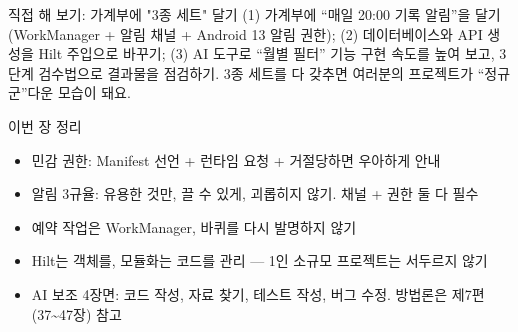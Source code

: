 \begin{tcbpractice}{직접 해 보기: 가계부에 "3종 세트" 달기}
(1) 가계부에 “매일 20:00 기록 알림”을 달기(WorkManager + 알림 채널 + Android 13 알림 권한); (2) 데이터베이스와 API 생성을 Hilt 주입으로 바꾸기; (3) AI 도구로 “월별 필터” 기능 구현 속도를 높여 보고, 3단계 검수법으로 결과물을 점검하기. 3종 세트를 다 갖추면 여러분의 프로젝트가 “정규군”다운 모습이 돼요.

\end{tcbpractice}

\begin{tcbsummary}{이번 장 정리}
\begin{itemize}
  \item 민감 권한: Manifest 선언 + 런타임 요청 + 거절당하면 우아하게 안내
  \item 알림 3규율: 유용한 것만, 끌 수 있게, 괴롭히지 않기. 채널 + 권한 둘 다 필수
  \item 예약 작업은 WorkManager, 바퀴를 다시 발명하지 않기
  \item Hilt는 객체를, 모듈화는 코드를 관리 — 1인 소규모 프로젝트는 서두르지 않기
  \item AI 보조 4장면: 코드 작성, 자료 찾기, 테스트 작성, 버그 수정. 방법론은 제7편(37\textasciitilde{}47장) 참고
\end{itemize}

\end{tcbsummary}
